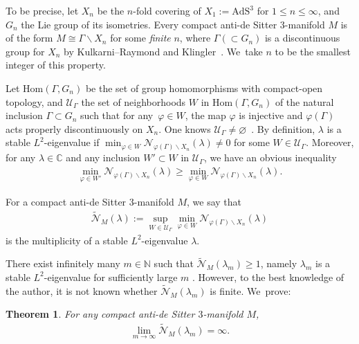\documentclass[10pt,a4paper]{amsart}
\numberwithin{equation}{section}
\newtheorem{Theorem}{Theorem}[section]
\begin{document}
To be precise, let $X_{n}$ be the $n$-fold covering of $X_{1}:=\mathrm{AdS}^{3}$
for $1\leq n \leq \infty$,
and $G_{n}$ the Lie group of its isometries.
Every compact anti-de Sitter $3$-manifold $M$ is of the form
$M\cong\Gamma\backslash X_{n}$ for some \textit{finite} $n$,
where $\Gamma (\subset G_{n})$ is a discontinuous group for $X_{n}$
by Kulkarni--Raymond \cite[Theorem~7.2]{KuRa85} and Klingler~\cite{Kl96}. We~take $n$ to be the smallest integer of this property.

Let $\mathrm{Hom}(\Gamma,G_{n})$ be the set of
group homomorphisms with compact-open topology,
and $\mathcal{U}_{\Gamma}$ the set of neighborhoods $W$ in
$\mathrm{Hom}(\Gamma,G_{n})$
of the natural inclusion $\Gamma \subset G_{n}$
such that for any~$\varphi \in W$, the map $\varphi$ is injective and
$\varphi(\Gamma)$ acts properly discontinuously on $X_{n}$.
One knows $\mathcal{U}_{\Gamma}\neq\varnothing$~\cite{Kl96,Kob98}.
By definition, $\lambda$ is a stable $L^2$-eigenvalue if
$\min_{\varphi \in W} \mathcal{N}_{\varphi(\Gamma)\backslash X_{n}}(\lambda)\neq0$
for some $W \in \mathcal{U}_{\Gamma}$.
Moreover, for any $\lambda \in \mathbb{C}$ and
any inclusion $W'\subset W$ in $\mathcal{U}_{\Gamma}$,
we have an obvious inequality
\begin{gather*}
\min_{\varphi \in W'}
\mathcal{N}_{\varphi(\Gamma)\backslash X_{n}}(\lambda)
\geq
\min_{\varphi \in W}
\mathcal{N}_{\varphi(\Gamma)\backslash X_{n}}(\lambda).
\end{gather*}

\begin{Definition}
\label{stab-mult}
For a compact anti-de Sitter $3$-manifold $M$, we say that
\begin{gather*}
\widetilde{\mathcal{N}}_{M}(\lambda):=
\sup_{W\in\mathcal{U}_{\Gamma}}\min_{\varphi \in W}
\mathcal{N}_{\varphi(\Gamma)\backslash X_{n}}(\lambda)
\end{gather*}
is the multiplicity of a stable $L^2$-eigenvalue $\lambda$.
\end{Definition}

There exist infinitely many $m\in \mathbb{N}$
such that $\widetilde{\mathcal{N}}_{M}(\lambda_{m})\geq1$,
namely $\lambda_{m}$ is a stable $L^2$-eigen\-value
for sufficiently large $m$ \cite[Corollary~9.10]{KaKob16}.
However, to the best knowledge of the author,
it is not known whether
$\widetilde{\mathcal{N}}_{M}(\lambda_{m})$
is finite. We~prove:

\begin{Theorem}\label{mthm2}
For any compact anti-de Sitter $3$-manifold $M$,
\begin{gather*}
\lim_{m \to \infty}
\widetilde{\mathcal{N}}_{M}(\lambda_{m})=\infty.
\end{gather*}
\end{Theorem}
\end{document}
